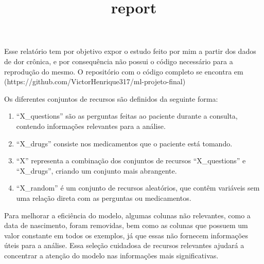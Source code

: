 \documentclass[11pt]{article}
\title{report}
\providecommand{\tightlist}{%
      \setlength{\itemsep}{0pt}\setlength{\parskip}{0pt}}
\begin{document}
    
    \maketitle
    
    

    
    Esse relatório tem por objetivo expor o estudo feito por mim a partir
dos dados de dor crônica, e por consequência não possui o código
necessário para a reprodução do mesmo. O repositório com o código
completo se encontra em
(https://github.com/VictorHenrique317/ml-projeto-final)

    Os diferentes conjuntos de recursos são definidos da seguinte forma:

\begin{enumerate}
\def\labelenumi{\arabic{enumi}.}
\tightlist
\item
  ``X\_questions'' são as perguntas feitas ao paciente durante a
  consulta, contendo informações relevantes para a análise.
\item
  ``X\_drugs'' consiste nos medicamentos que o paciente está tomando.
\item
  ``X'' representa a combinação dos conjuntos de recursos
  ``X\_questions'' e ``X\_drugs'', criando um conjunto mais abrangente.
\item
  ``X\_random'' é um conjunto de recursos aleatórios, que contêm
  variáveis sem uma relação direta com as perguntas ou medicamentos.
\end{enumerate}

Para melhorar a eficiência do modelo, algumas colunas não relevantes,
como a data de nascimento, foram removidas, bem como as colunas que
possuem um valor constante em todos os exemplos, já que essas não
fornecem informações úteis para a análise. Essa seleção cuidadosa de
recursos relevantes ajudará a concentrar a atenção do modelo nas
informações mais significativas.
\end{document}
